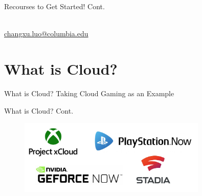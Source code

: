 \documentclass[aspectratio=169, 12pt]{beamer}
\begin{document}
\begin{frame}{Recourses to Get Started! Cont.}
\centering
{}
\centering
\\\medskip
\href{mailto:changxu.luo@columbia.edu}{changxu.luo@columbia.edu}
\end{frame}


\section{What is Cloud?}
\begin{frame}{What is Cloud? Taking Cloud Gaming as an Example}
\centering
{}
\end{frame}

\begin{frame}{What is Cloud? Cont.}
\centering
    \begin{figure}
        \centering
        \includegraphics[width=0.8\textwidth]{assets/cloud_gaming.png}
        \label{fig:cloudgaming}
    \end{figure}
\end{frame}
\end{document}
